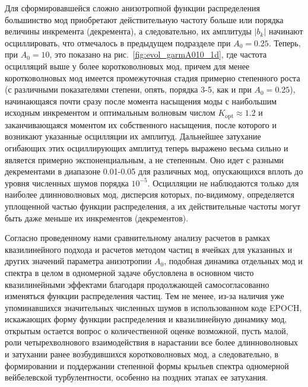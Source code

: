 Для сформировавшейся сложно анизотропной функции распределения
большинство мод приобретают действительную частоту больше или порядка величины инкремента (декремента), а следовательно, их амплитуды $|b_{k}|$ начинают осциллировать, что отмечалось в предыдущем подразделе при $A_0=0.25$. Теперь, при $A_0=10$, это показано на рис.~\ref{fig:evol_garmA010_1d}, где частота осцилляций выше у более коротковолновых мод, причем для менее коротковолновых мод имеется промежуточная стадия примерно степенного роста (с различными показателями степени, опять, порядка 3-5, как и при $A_0=0.25$), начинающаяся почти сразу после момента насыщения моды с наибольшим исходным инкрементом и оптимальным волновым числом $K_\mathrm{opt}\approx1.2$ и заканчивающаяся моментом их собственного насыщения, после которого и возникают указанные осцилляции их амплитуд. Дальнейшее затухание огибающих этих осциллирующих амплитуд теперь выражено весьма сильно и является примерно экспоненциальным, а не степенным. Оно идет с разными декрементами в диапазоне 0.01-0.05 для различных мод, опускающихся вплоть до уровня численных шумов порядка $10^{-5}$. Осцилляции не наблюдаются только для наиболее длинноволновых мод, дисперсия которых, по-видимому, определяется уплощенной частью функции распределения, а их действительные частоты могут быть даже меньше их инкрементов (декрементов).

Согласно проведенному нами сравнительному анализу расчетов в рамках квазилинейного подхода и расчетов методом частиц в ячейках для указанных и других значений параметра анизотропии $A_0$, подобная динамика отдельных мод и спектра в целом в одномерной задаче обусловлена в основном чисто квазилинейными эффектами благодаря продолжающей самосогласованно изменяться функции распределения частиц. Тем не менее, из-за наличия уже упоминавшихся значительных численных шумов в использованном коде EPOCH, искажающих форму функции распределения и квазилинейную динамику мод, открытым остается вопрос о количественной оценке возможной, пусть малой, роли четырехволнового взаимодействия в нарастании все более длинноволновых и затухании ранее возбудившихся коротковолновых мод, а следовательно, в формировании и поддержании степенной формы крыльев спектра одномерной вейбелевской турбулентности, особенно на поздних этапах ее затухания.